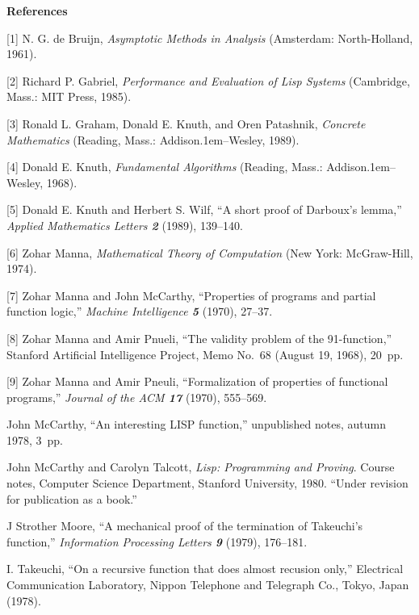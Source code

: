 \documentclass{article}
\begin{document}
\bigskip
\centerline{\bf References}

\parskip 3pt

\medskip

\bib
\phantom{1}[1]\enspace
N. G. de Bruijn, {\sl Asymptotic Methods in Analysis\/} 
(Amsterdam: North-Holland, 1961).

\bib
\phantom{1}[2]\enspace
Richard P. Gabriel, {\sl Performance and Evaluation of Lisp Systems\/}
(Cambridge, Mass.: MIT Press, 1985).

\bib
\phantom{1}[3]\enspace
Ronald L. Graham, Donald E. Knuth, and Oren Patashnik, {\sl Concrete
Mathematics\/} (Reading, Mass.: Addison\kern.1em--Wesley, 1989).

\bib
\phantom{1}[4]\enspace
Donald E. Knuth, {\sl Fundamental Algorithms\/} (Reading, Mass.:
Addison\kern.1em--Wesley, 1968).

\bib
\phantom{1}[5]\enspace
Donald E. Knuth and Herbert S. Wilf, ``A short proof of Darboux's
lemma,'' {\sl Applied Mathematics Letters\/ \bf 2} (1989), 139--140.

\bib
\phantom{1}[6]\enspace
Zohar Manna, {\sl Mathematical Theory of Computation\/} (New York:
McGraw-Hill, 1974).

\bib
\phantom{1}[7]\enspace
Zohar Manna and John McCarthy, ``Properties of programs and partial
function logic,'' {\sl Machine Intelligence\/ \bf 5} (1970), 27--37.

\bib
\phantom{1}[8]\enspace
Zohar Manna and Amir Pnueli, ``The validity problem of the
91-function,''
Stanford Artificial Intelligence Project, Memo No.~68 (August 19,
1968), 20~pp.

\bib
\phantom{1}[9]\enspace
Zohar Manna and Amir Pneuli, ``Formalization of properties of
functional programs,'' {\sl Journal of the ACM\/ \bf 17} (1970), 555--569.

\bib
[10]\enspace
John McCarthy, ``An interesting LISP function,'' unpublished
notes, autumn 1978, 3~pp.

\bib
[11]\enspace
John McCarthy and Carolyn Talcott, {\sl Lisp: Programming and Proving}.
Course notes, Computer Science Department, Stanford University, 1980.
``Under revision for publication as a book.''

\bib
[12]\enspace
J Strother Moore, ``A mechanical proof of the termination of
Takeuchi's function,'' {\sl Information Processing Letters\/ \bf 9}
(1979), 176--181.

\bib
[13]\enspace
I. Takeuchi, ``On a recursive function that does almost recusion
only,'' Electrical Communication Laboratory, Nippon Telephone and 
Telegraph Co., Tokyo, Japan (1978).
\end{document}
